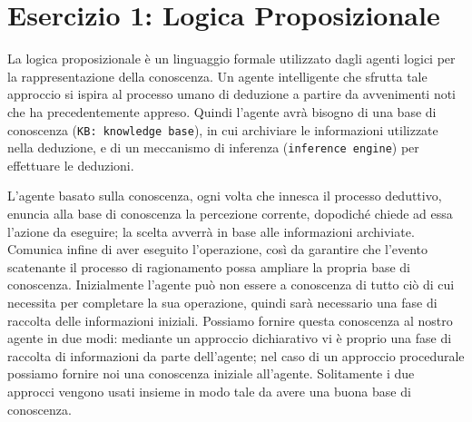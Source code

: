 \raggedright
{}
	\label{ch:cc}
	\section{Esercizio 1: Logica Proposizionale}
		\label{sec:es1}
		La logica proposizionale è un linguaggio formale utilizzato dagli agenti logici per la rappresentazione della conoscenza. Un agente intelligente che sfrutta tale approccio si ispira al processo umano di deduzione a partire da avvenimenti noti che ha precedentemente appreso. Quindi l'agente avrà bisogno di una base di conoscenza (\texttt{KB: knowledge base}), in cui archiviare le informazioni utilizzate nella deduzione, e di un meccanismo di inferenza (\texttt{inference engine}) per effettuare le deduzioni.
		\par
		L'agente basato sulla conoscenza, ogni volta che innesca il processo deduttivo, enuncia alla base di conoscenza la percezione corrente, dopodiché chiede ad essa l'azione da eseguire; la scelta avverrà in base alle informazioni archiviate. Comunica infine di aver eseguito l'operazione, così da garantire che l'evento scatenante il processo di ragionamento possa ampliare la propria base di conoscenza. Inizialmente l'agente può non essere a conoscenza di tutto ciò di cui necessita per completare la sua operazione, quindi sarà necessario una fase di raccolta delle informazioni iniziali. Possiamo fornire questa conoscenza al nostro agente in due modi: mediante un approccio dichiarativo vi è proprio una fase di raccolta di informazioni da parte dell'agente; nel caso di un approccio procedurale possiamo fornire noi una conoscenza iniziale all'agente. Solitamente i due approcci vengono usati insieme in modo tale da avere una buona base di conoscenza.
		\par
		
